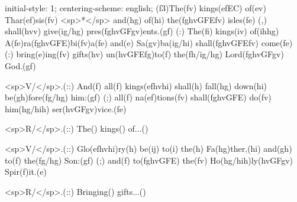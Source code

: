initial-style: 1;
centering-scheme: english;
(f3)The(fv) kings(efEC) of(ev) Thar(ef)sis(fv) <sp>*</sp> and(hg) of(hi) the(fghvGFEfv) isles(fe) (,) shall(hvv) give(ig/hg) pres(fghvGFgv)ents.(gf) (:) The(fi) kings(iv) of(ihhg) A(fe)ra(fghvGFE)bi(fv)a(fe) and(e) Sa(gv)ba(ig/hi) shall(fghvGFEfv) come(fe) (:) bring(e)ing(fv) gifts(hv) un(hvGFEfg)to(f) the(fh/ig/hg) Lord(fghvGFgv) God.(gf)

<sp>V/</sp>.(::) And(f) all(f) kings(efhvhi) shall(h) fall(hg) down(hi) be(gh)fore(fg/hg) him:(gf) (;) all(f) na(ef)tions(fv) shall(fghvGFE) do(fv) him(hg/hih) ser(hvGFgv)vice.(fe) 

<sp>R/</sp>.(::) The() kings() of...()

<sp>V/</sp>.(::) Glo(efhvhi)ry(h) be(ij) to(i) the(h) Fa(hg)ther,(hi) and(gh) to(f) the(fg/hg) Son:(gf) (;) and(f) to(fghvGFE) the(fv) Ho(hg/hih)ly(hvGFgv) Spir(f)it.(e)

<sp>R/</sp>.(::) Bringing() gifts...()